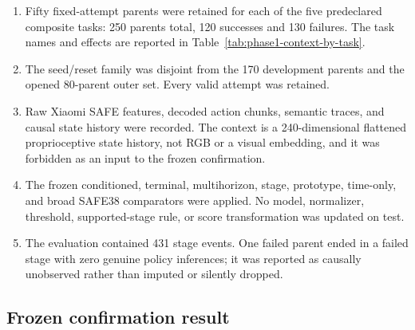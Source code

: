 \begin{enumerate}
  \item Fifty fixed-attempt parents were retained for each of the five predeclared composite tasks: 250 parents total, 120 successes and 130 failures. The task names and effects are reported in Table~\ref{tab:phase1-context-by-task}.
  \item The seed/reset family was disjoint from the 170 development parents and the opened 80-parent outer set. Every valid attempt was retained.
  \item Raw Xiaomi SAFE features, decoded action chunks, semantic traces, and causal state history were recorded. The context is a 240-dimensional flattened proprioceptive state history, not RGB or a visual embedding, and it was forbidden as an input to the frozen confirmation.
  \item The frozen conditioned, terminal, multihorizon, stage, prototype, time-only, and broad SAFE38 comparators were applied. No model, normalizer, threshold, supported-stage rule, or score transformation was updated on test.
  \item The evaluation contained 431 stage events. One failed parent ended in a failed stage with zero genuine policy inferences; it was reported as causally unobserved rather than imputed or silently dropped.
\end{enumerate}




\subsection{Frozen confirmation result}

